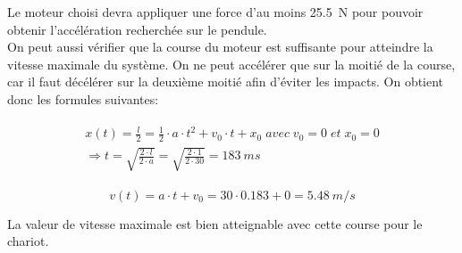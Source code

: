 Le moteur choisi devra appliquer une force d'au moins 25.5~N pour pouvoir obtenir l'accélération recherchée sur le pendule.\\

On peut aussi vérifier que la course du moteur est suffisante pour atteindre la vitesse maximale du système. On ne peut accélérer que sur la
moitié de la course, car il faut décélérer sur la deuxième moitié afin d'éviter les impacts. On obtient donc les formules suivantes:

\begin{align}\label{eq:TempsMouv}
    \begin{split}
        x(t) = \frac{l}{2} = \frac{1}{2} \cdot a \cdot t^2 + v_0 \cdot t + x_0 \; avec \; v_0 = 0 \; et \; x_0 = 0 \\ \Rightarrow t = \sqrt{\frac{2 \cdot l}{2 \cdot a}} = \sqrt{\frac{2 \cdot 1}{2 \cdot 30}} = 183~ms
    \end{split}
\end{align}

\begin{equation}
    v(t) = a \cdot t + v_0 = 30 \cdot 0.183 + 0 = 5.48~m/s
\end{equation}

La valeur de vitesse maximale est bien atteignable avec cette course pour le chariot.